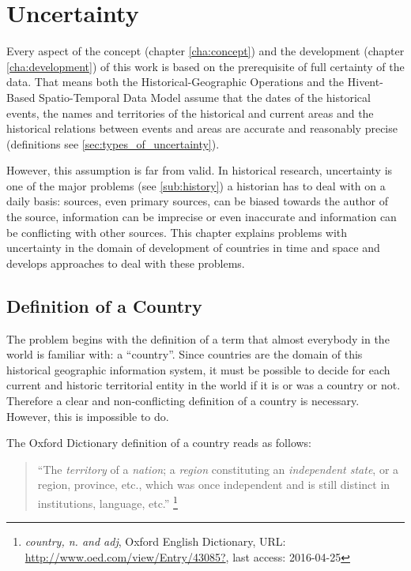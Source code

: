 

\chapter{Uncertainty} %
\label{cha:uncertainty}

Every aspect of the concept (chapter \ref{cha:concept}) and the development (chapter \ref{cha:development}) of this work is based on the prerequisite of full certainty of the data. That means both the Historical-Geographic Operations and the Hivent-Based Spatio-Temporal Data Model assume that the dates of the historical events, the names and territories of the historical and current areas and the historical relations between events and areas are accurate and reasonably precise (definitions see \ref{sec:types_of_uncertainty}).

However, this assumption is far from valid. In historical research, uncertainty is one of the major problems (see \ref{sub:history}) a historian has to deal with on a daily basis: sources, even primary sources, can be biased towards the author of the source, information can be imprecise or even inaccurate and information can be conflicting with other sources. This chapter explains problems with uncertainty in the domain of development of countries in time and space and develops approaches to deal with these problems.


\section{Definition of a Country} %
\label{sec:definition_of_a_country}

The problem begins with the definition of a term that almost everybody in the world is familiar with: a ``country''. Since countries are the domain of this historical geographic information system, it must be possible to decide for each current and historic territorial entity in the world if it is or was a country or not. Therefore a clear and non-conflicting definition of a country is necessary. However, this is impossible to do.

The Oxford Dictionary definition of a country reads as follows:
\begin{quote}
  ``The \emph{territory} of a \emph{nation}; a \emph{region} constituting an \emph{independent state}, or a region, province, etc., which was once independent and is still distinct in institutions, language, etc.''
  \footnote{\textit{country, n. and adj}, Oxford English Dictionary, URL: \url{http://www.oed.com/view/Entry/43085?}, last access: 2016-04-25}
\end{quote}

